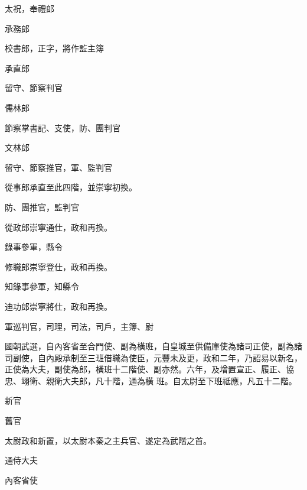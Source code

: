 \begin{pinyinscope}
 太祝，奉禮郎



 承務郎



 校書郎，正字，將作監主簿



 承直郎



 留守、節察判官



 儒林郎



 節察掌書記、支使，防、團判官



 文林郎



 留守、節察推官，軍、監判官



 從事郎承直至此四階，並崇寧初換。



 防、團推官，監判官



 從政郎崇寧通仕，政和再換。



 錄事參軍，縣令



 修職郎崇寧登仕，政和再換。



 知錄事參軍，知縣令



 迪功郎崇寧將仕，政和再換。



 軍巡判官，司理，司法，司戶，主簿、尉



 國朝武選，自內客省至合門使、副為橫班，自皇城至供備庫使為諸司正使，副為諸司副使，自內殿承制至三班借職為使臣，元豐未及更，政和二年，乃詔易以新名，正使為大夫，副使為郎，橫班十二階使、副亦然。六年，及增置宣正、履正、協忠、翊衛、親衛大夫郎，凡十階，通為橫
 班。自太尉至下班祗應，凡五十二階。



 新官



 舊官



 太尉政和新置，以太尉本秦之主兵官、遂定為武階之首。



 通侍大夫



 內客省使




\end{pinyinscope}
